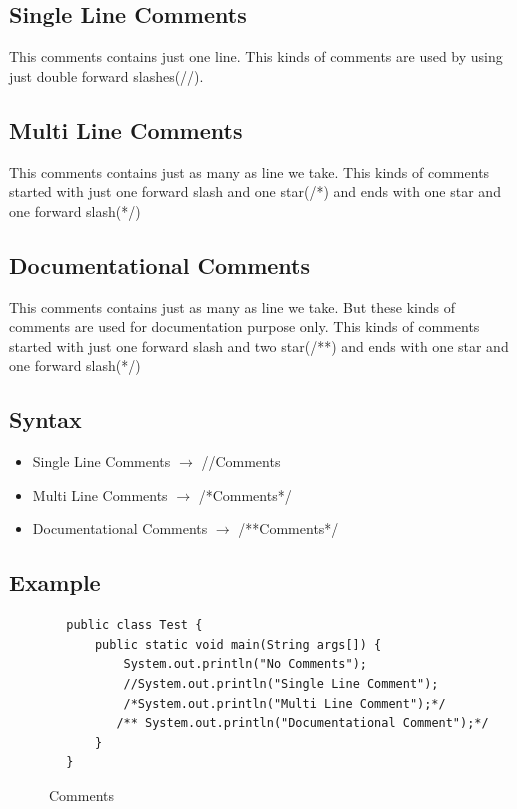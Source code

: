 \documentclass[openany]{book}  %
\begin{document}
\begin{flushleft}
    \subsection{Single Line Comments}
    This comments contains just one line. This kinds of comments are used by using just double forward slashes(//).
    \subsection{Multi Line Comments}
    This comments contains just as many as line we take. This kinds of comments started with just one forward slash and one star(/*) and ends with one star and one forward slash(*/)
    \subsection{Documentational Comments}
    This comments contains just as many as line we take. But these kinds of comments are used for documentation purpose only.
    This kinds of comments started with just one forward slash and two star(/**) and ends with one star and one forward slash(*/)
    \subsection{Syntax}
    \begin{itemize}
        \item Single Line Comments $\to$ //Comments
        \item Multi Line Comments $\to$ /*Comments*/
        \item Documentational Comments $\to$ /**Comments*/
    \end{itemize}
    \subsection{Example}
    \begin{center}
        \begin{verbatim}
        public class Test {
            public static void main(String args[]) {
                System.out.println("No Comments");
                //System.out.println("Single Line Comment");
                /*System.out.println("Multi Line Comment");*/
               /** System.out.println("Documentational Comment");*/
            }
        }
    \end{verbatim}
    \end{center}
    \begin{figure}[htbp]
        \begin{center}
            \caption{Comments\cite{Ref3}}
        \end{center}
    \end{figure}

\end{flushleft}
\end{document}
